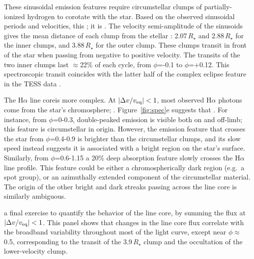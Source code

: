 \documentclass[11pt,twocolumn,tighten]{aastex7}
\begin{document}
These sinusoidal emission features require circumstellar clumps of
partially-ionized hydrogen to corotate with the star.  Based on the
observed sinusoidal periods and velocities, this ; it is .  The velocity semi-amplitude of the
sinusoids gives the mean distance of each clump from the stellar
: 2.07\,$R_\star$ and 2.88\,$R_\star$ for the
inner clumps, and 3.88\,$R_\star$ for the outer clump.   These clumps
transit in front of the star when passing from negative to positive
velocity.  The transits of the two inner clumps last $\approx$22\% of
each cycle, from $\phi$=-0.1 to $\phi$=+0.12.  This spectroscopic
transit coincides with the latter half of the complex eclipse feature
in the TESS data .

The H$\alpha$ line coreis more complex.  At $|\Delta v / v_{\rm
eq}|<1$, most observed H$\alpha$ photons come from the star's
chromosphere; .  Figure~\ref{fig:spec}e suggests that
.  For instance, from
$\phi$=0-0.3, double-peaked emission is visible both on and off-limb;
this feature is circumstellar in origin.  However, the emission
feature that crosses the star from $\phi$=0.4-0.9 is brighter than the
circumstellar clumps, and its slow speed instead suggests it is
associated with a bright region on the star's surface.  Similarly, from
$\phi$=0.6-1.15 a 20\% deep absorption feature slowly crosses the
H$\alpha$ line profile.  This feature could be either a
chromospherically dark region (e.g.~a spot group), or an azimuthally
extended component of the circumstellar material.  The origin of the
other bright and dark streaks passing across the line core is similarly ambiguous. 

 a final exercise to quantify the
behavior of the line core, by summing the  flux at
$|\Delta v / v_{\rm eq}|<1$.  This panel shows that changes in the
line core flux  correlate with the
broadband variability throughout most of the light curve, except near
$\phi$$\approx$0.5, corresponding to the transit of the 3.9\,$R_\star$
clump and the occultation of the lower-velocity clump.
\end{document}
